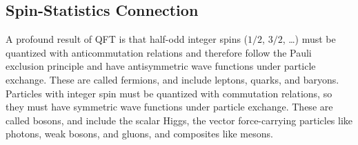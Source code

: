 \documentclass[a4paper,twoside,master.tex]{subfiles}
\begin{document}
\subsection{Spin-Statistics Connection}\label{sub:spin-statistics_connection}

A profound result of QFT is that half-odd integer spins ($ 1/2 $, $ 3/2 $, \ldots) must be quantized with anticommutation relations and therefore follow the Pauli exclusion principle and have antisymmetric wave functions under particle exchange. These are called fermions, and include leptons, quarks, and baryons. Particles with integer spin must be quantized with commutation relations, so they must have symmetric wave functions under particle exchange. These are called bosons, and include the scalar Higgs, the vector force-carrying particles like photons, weak bosons, and gluons, and composites like mesons.
\end{document}
